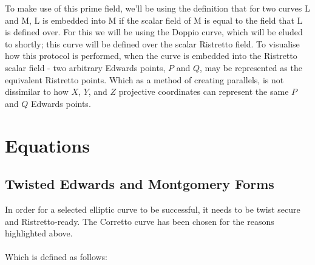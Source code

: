 \documentclass{article}
\begin{document}
To make use of this prime field, we’ll be using the definition that for two curves L and M, L is embedded into M if the scalar field of M is equal to the field that L is defined over. For this we will be using the Doppio curve, which will be eluded to shortly; this curve will be defined over the scalar Ristretto field. To visualise how this protocol is performed, when the curve is embedded into the Ristretto scalar field - two arbitrary Edwards points, $P$ and $Q$, may be represented as the equivalent Ristretto points. Which as a method of creating parallels, is not dissimilar to how $X$, $Y$, and $Z$ projective coordinates can represent the same $P$ and $Q$ Edwards points.
\section{Equations}
\subsection{Twisted Edwards and Montgomery Forms}
In order for a selected elliptic curve to be successful, it needs to be twist secure and Ristretto-ready. The Corretto curve has been chosen for the reasons highlighted above. \\\\
Which is defined as follows: \\\\
\noindent{}
\end{document}
